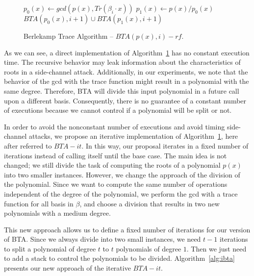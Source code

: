 \begin{figure}[ht]
\begin{algorithm}[H]
    $p_{0}(x) \gets gcd(p(x), Tr(\beta_{i}\cdot x))$\;
    $p_{1}(x) \gets p(x) / p_{0}(x)$ \;
\Return $BTA(p_{0}(x), i + 1) \cup BTA(p_{1}(x), i + 1)$\;
 \caption{Berlekamp Trace Algorithm -- $BTA(p(x), i)-rf$.}
  \label{alg:bta}
\end{algorithm}
\end{figure}

As we can see, a direct implementation of Algorithm~\ref{alg:bta} has no constant execution time. The recursive behavior may leak information about the characteristics of roots in a side-channel attack. Additionally, in our experiments, we note that the behavior of the gcd with the trace function might result in a polynomial with the same degree. Therefore, BTA will divide this input polynomial in a future call upon a different basis. Consequently, there is no guarantee of a constant number of executions because we cannot control if a polynomial will be split or not. 

In order to avoid the nonconstant number of executions and avoid timing side-channel attacks, we propose an iterative implementation of Algorithm~\ref{alg:bta}, here after referred to $BTA-it$. In this way, our proposal iterates in a fixed number of iterations instead of calling itself until the base case. The main idea is not changed; we still divide the task of computing the roots of a polynomial $p(x)$ into two smaller instances. However, we change the approach of the division of the polynomial. Since we want to compute the same number of operations independent of the degree of the polynomial, we perform the gcd with a trace function for all basis in $\beta$, and choose a division that results in two new polynomials with a medium degree.

This new approach allows us to define a fixed number of iterations for our version of BTA. Since we always divide into two small instances, we need $t-1$ iterations to split a polynomial of degree $t$ to $t$ polynomials of degree $1$. Then we just need to add a stack to control the polynomials to be divided. Algorithm~\ref{alg:ibta} presents our new approach of the iterative $BTA-it$.


